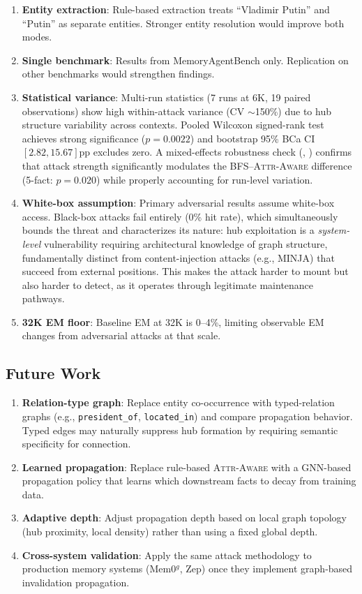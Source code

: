\documentclass[11pt]{article}
\newcommand{\attraware}{\textsc{Attr-Aware}}
\begin{document}
\begin{enumerate}
  \item \textbf{Entity extraction}: Rule-based extraction treats ``Vladimir Putin'' and ``Putin'' as separate entities. Stronger entity resolution would improve both modes.
  \item \textbf{Single benchmark}: Results from MemoryAgentBench only. Replication on other benchmarks would strengthen findings.
  \item \textbf{Statistical variance}: Multi-run statistics (7 runs at 6K, 19 paired observations) show high within-attack variance (CV $\sim$150\%) due to hub structure variability across contexts. Pooled Wilcoxon signed-rank test achieves strong significance ($p = 0.0022$) and bootstrap 95\% BCa CI $[2.82, 15.67]$pp excludes zero. A mixed-effects robustness check (, ) confirms that attack strength significantly modulates the BFS--\attraware{} difference (5-fact: $p = 0.020$) while properly accounting for run-level variation.
  \item \textbf{White-box assumption}: Primary adversarial results assume white-box access. Black-box attacks fail entirely (0\% hit rate), which simultaneously bounds the threat and characterizes its nature: hub exploitation is a \textit{system-level} vulnerability requiring architectural knowledge of graph structure, fundamentally distinct from content-injection attacks (e.g., MINJA) that succeed from external positions. This makes the attack harder to mount but also harder to detect, as it operates through legitimate maintenance pathways.
  \item \textbf{32K EM floor}: Baseline EM at 32K is 0--4\%, limiting observable EM changes from adversarial attacks at that scale.
\end{enumerate}

\subsection{Future Work}

\begin{enumerate}
  \item \textbf{Relation-type graph}: Replace entity co-occurrence with typed-relation graphs (e.g., \texttt{president\_of}, \texttt{located\_in}) and compare propagation behavior. Typed edges may naturally suppress hub formation by requiring semantic specificity for connection.
  \item \textbf{Learned propagation}: Replace rule-based \attraware{} with a GNN-based propagation policy that learns which downstream facts to decay from training data.
  \item \textbf{Adaptive depth}: Adjust propagation depth based on local graph topology (hub proximity, local density) rather than using a fixed global depth.
  \item \textbf{Cross-system validation}: Apply the same attack methodology to production memory systems (Mem0$^g$, Zep) once they implement graph-based invalidation propagation.
\end{enumerate}
\end{document}
